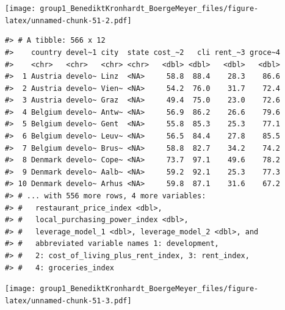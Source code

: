 \documentclass[
  11pt,
  a4paper,
  twoside]{scrbook}
\newenvironment{Shaded}{\begin{snugshade}}{\end{snugshade}}
\newcommand{\FloatTok}[1]{\textcolor[rgb]{0.00,0.00,0.81}{#1}}
\newcommand{\FunctionTok}[1]{\textcolor[rgb]{0.00,0.00,0.00}{#1}}
\newcommand{\NormalTok}[1]{#1}
\newcommand{\OtherTok}[1]{\textcolor[rgb]{0.56,0.35,0.01}{#1}}
\newcommand{\SpecialCharTok}[1]{\textcolor[rgb]{0.00,0.00,0.00}{#1}}
\newcommand{\StringTok}[1]{\textcolor[rgb]{0.31,0.60,0.02}{#1}}
\begin{document}
\linespread{1}\texttt{[image: group1\_BenediktKronhardt\_BoergeMeyer\_files/figure-latex/unnamed-chunk-51-2.pdf]} \linespread{1}

\begin{Shaded}
\end{Shaded}

\linespread{1}

\begin{verbatim}
#> # A tibble: 566 x 12
#>    country devel~1 city  state cost_~2   cli rent_~3 groce~4
#>    <chr>   <chr>   <chr> <chr>   <dbl> <dbl>   <dbl>   <dbl>
#>  1 Austria develo~ Linz  <NA>     58.8  88.4    28.3    86.6
#>  2 Austria develo~ Vien~ <NA>     54.2  76.0    31.7    72.4
#>  3 Austria develo~ Graz  <NA>     49.4  75.0    23.0    72.6
#>  4 Belgium develo~ Antw~ <NA>     56.9  86.2    26.6    79.6
#>  5 Belgium develo~ Gent  <NA>     55.8  85.3    25.3    77.1
#>  6 Belgium develo~ Leuv~ <NA>     56.5  84.4    27.8    85.5
#>  7 Belgium develo~ Brus~ <NA>     58.8  82.7    34.2    74.2
#>  8 Denmark develo~ Cope~ <NA>     73.7  97.1    49.6    78.2
#>  9 Denmark develo~ Aalb~ <NA>     59.2  92.1    25.3    77.3
#> 10 Denmark develo~ Arhus <NA>     59.8  87.1    31.6    67.2
#> # ... with 556 more rows, 4 more variables:
#> #   restaurant_price_index <dbl>,
#> #   local_purchasing_power_index <dbl>,
#> #   leverage_model_1 <dbl>, leverage_model_2 <dbl>, and
#> #   abbreviated variable names 1: development,
#> #   2: cost_of_living_plus_rent_index, 3: rent_index,
#> #   4: groceries_index
\end{verbatim}

\linespread{1}

\begin{Shaded}
\end{Shaded}

\linespread{1}\texttt{[image: group1\_BenediktKronhardt\_BoergeMeyer\_files/figure-latex/unnamed-chunk-51-3.pdf]}



\doublespacing
\end{document}
